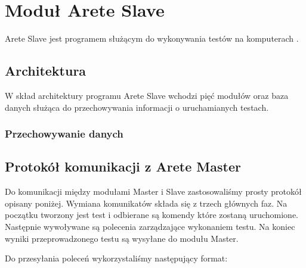 \documentclass[00-praca-magisterska.tex]{subfiles}
\begin{document}
\chapter{Moduł Arete Slave}

Arete Slave jest programem służącym do wykonywania testów na komputerach
.

\section{Architektura}

W skład architektury programu Arete Slave wchodzi pięć modułów oraz baza danych
służąca do przechowywania informacji o uruchamianych testach.


\subsection{Przechowywanie danych}


\section{Protokół komunikacji z Arete Master}


Do komunikacji między modułami Master i Slave zastosowaliśmy prosty protokół
opisany poniżej. Wymiana komunikatów składa się z trzech głównych faz. Na
początku tworzony jest test i odbierane są komendy które zostaną uruchomione.
Następnie wywoływane są polecenia zarządzające wykonaniem testu.  Na koniec
wyniki przeprowadzonego testu są wysyłane do modułu Master. 

Do przesyłania poleceń wykorzystaliśmy następujący format:

\end{document}
